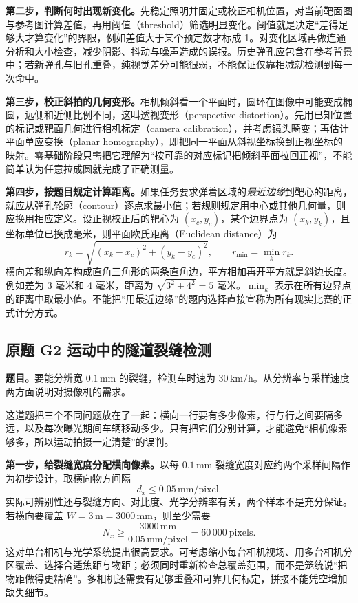 \textbf{第二步，判断何时出现新变化。}先稳定照明并固定或校正相机位置，对当前靶面图与参考图计算差值，再用阈值（threshold）筛选明显变化。阈值就是决定“差得足够大才算变化”的界限，例如差值大于某个预定数才标成 1。对变化区域再做连通分析和大小检查，减少阴影、抖动与噪声造成的误报。历史弹孔应包含在参考背景中；若新弹孔与旧孔重叠，纯视觉差分可能很弱，不能保证仅靠相减就检测到每一次命中。

\textbf{第三步，校正斜拍的几何变形。}相机倾斜看一个平面时，圆环在图像中可能变成椭圆，远侧和近侧比例不同，这叫透视变形（perspective distortion）。先用已知位置的标记或靶面几何进行相机标定（camera calibration），并考虑镜头畸变；再估计平面单应变换（planar homography），即把同一平面从斜视坐标换到正视坐标的映射。零基础阶段只需把它理解为“按可靠的对应标记把倾斜平面拉回正视”，不能简单认为任意拉成圆就完成了正确测量。

\textbf{第四步，按题目规定计算距离。}如果任务要求弹着区域的\emph{最近边缘}到靶心的距离，就应从弹孔轮廓（contour）逐点求最小值；若规则规定用中心或其他几何量，则应换用相应定义。设正视校正后的靶心为 $(x_c,y_c)$，某个边界点为 $(x_k,y_k)$，且坐标单位已换成毫米，则平面欧氏距离（Euclidean distance）为
\[
 r_k=\sqrt{(x_k-x_c)^2+(y_k-y_c)^2},\qquad r_{\min}=\min_k r_k.
\]
横向差和纵向差构成直角三角形的两条直角边，平方相加再开平方就是斜边长度。例如差为 3 毫米和 4 毫米，距离为 $\sqrt{3^2+4^2}=5$ 毫米。$\min_k$ 表示在所有边界点的距离中取最小值。不能把“用最近边缘”的题内选择直接宣称为所有现实比赛的正式计分方式。

\subsection*{原题 G2 运动中的隧道裂缝检测}
\label{original:G2}
\textbf{题目。}要能分辨宽 $0.1\,\mathrm{mm}$ 的裂缝，检测车时速为 $30\,\mathrm{km/h}$。从分辨率与采样速度两方面说明对摄像机的需求。

这道题把三个不同问题放在了一起：横向一行要有多少像素，行与行之间要隔多远，以及每次曝光期间车辆移动多少。只有把它们分别计算，才能避免“相机像素够多，所以运动拍摄一定清楚”的误判。

\textbf{第一步，给裂缝宽度分配横向像素。}以每 $0.1\,\mathrm{mm}$ 裂缝宽度对应约两个采样间隔作为初步设计，取横向物方间隔
\[
 d_x\leq0.05\,\mathrm{mm/pixel}.
\]
实际可辨别性还与裂缝方向、对比度、光学分辨率有关，两个样本不是充分保证。若横向要覆盖 $W=3\,\mathrm{m}=3000\,\mathrm{mm}$，则至少需要
\[
 N_x\geq\frac{3000\,\mathrm{mm}}{0.05\,\mathrm{mm/pixel}}
       =60\,000\ \text{pixels}.
\]
这对单台相机与光学系统提出很高要求。可考虑缩小每台相机视场、用多台相机分区覆盖、选择合适焦距与物距；必须同时重新检查总覆盖范围，而不是笼统说“把物距做得更精确”。多相机还需要有足够重叠和可靠几何标定，拼接不能凭空增加缺失细节。

